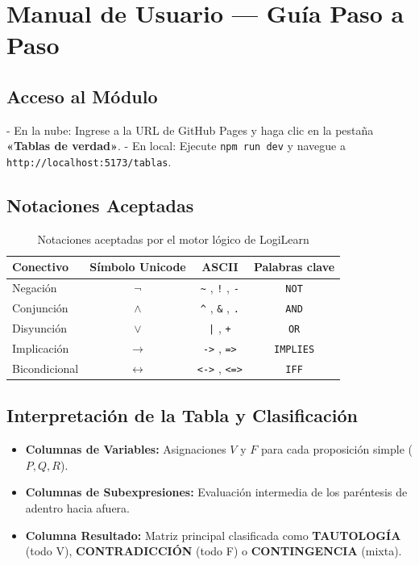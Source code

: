 \documentclass[11pt,a4paper]{article}
\begin{document}
\section{Manual de Usuario --- Guía Paso a Paso}

\subsection{Acceso al Módulo}
- En la nube: Ingrese a la URL de GitHub Pages y haga clic en la pestaña \textbf{«Tablas de verdad»}.
- En local: Ejecute \texttt{npm run dev} y navegue a \texttt{http://localhost:5173/tablas}.

\subsection{Notaciones Aceptadas}
\begin{table}[H]
\centering
\caption{Notaciones aceptadas por el motor lógico de LogiLearn}
\label{tab:notaciones}
\small
\begin{tabular}{lccc}
\toprule
\textbf{Conectivo} & \textbf{Símbolo Unicode} & \textbf{ASCII} & \textbf{Palabras clave} \\
\midrule
Negación & $\neg$ & \texttt{\~{}} , \texttt{!} , \texttt{-} & \texttt{NOT} \\
Conjunción & $\land$ & \texttt{\^{}} , \texttt{\&} , \texttt{.} & \texttt{AND} \\
Disyunción & $\lor$ & \texttt{|} , \texttt{+} & \texttt{OR} \\
Implicación & $\to$ & \texttt{->} , \texttt{=>} & \texttt{IMPLIES} \\
Bicondicional & $\leftrightarrow$ & \texttt{<->} , \texttt{<=>} & \texttt{IFF} \\
\bottomrule
\end{tabular}
\end{table}

\subsection{Interpretación de la Tabla y Clasificación}
\begin{itemize}[leftmargin=*]
  \item \textbf{Columnas de Variables:} Asignaciones $V$ y $F$ para cada proposición simple ($P, Q, R$).
  \item \textbf{Columnas de Subexpresiones:} Evaluación intermedia de los paréntesis de adentro hacia afuera.
  \item \textbf{Columna Resultado:} Matriz principal clasificada como \textbf{TAUTOLOGÍA} (todo V), \textbf{CONTRADICCIÓN} (todo F) o \textbf{CONTINGENCIA} (mixta).
\end{itemize}
\end{document}
